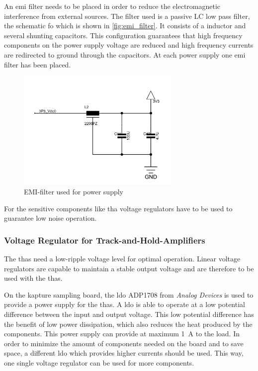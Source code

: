 An \gls{emi} filter needs to be placed in order to reduce the electromagnetic interference from external sources. 
The filter used is a passive LC low pass filter, the schematic fo which is shown in \autoref{fig:emi_filter}.
It consists of a inductor and several shunting capacitors.
This configuration guarantees that high frequency components on the power supply voltage are reduced and high frequency currents are redirected to ground through the capacitors.
At each power supply one \gls{emi} filter has been placed. 
\begin{figure}[tb]
	\centering
	\includegraphics[width = 0.7\textwidth]{chap/04-theresa/img/schematic/emi_filter}
	\caption{EMI-filter used for power supply}
	\label{fig:emi_filter}
\end{figure}
For the sensitive components like \gls{tha} voltage regulators have to be used to guarantee low noise operation.


\subsubsection*{Voltage Regulator for Track-and-Hold-Amplifiers}
The \glspl{tha} need a low-ripple voltage level for optimal operation. 
Linear voltage regulators are capable to maintain a stable output voltage and are therefore to be used with the \glspl{tha}.

On the \gls{kapture} sampling board, the \gls{ldo} ADP1708 from \textit{Analog Devices} is used to provide a power supply for the \glspl{tha}. 
A \gls{ldo} is able to operate at a low potential difference between the input and output voltage. 
This low potential difference has the benefit of low power dissipation, which also reduces the heat produced by the components.  
This power supply can provide at maximum \SI{1}{\ampere} to the load. 
In order to minimize the amount of components needed on the board and to save space, a different \gls{ldo} which provides higher currents should be used. 
This way, one single voltage regulator can be used for more components.

